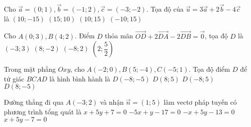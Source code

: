 \begin{ex}%
	Cho $\vec{a}=(0; 1), \vec{b}=(-1; 2), \vec{c}=(-3;-2)$. Tọa độ của $\vec{u}=3 \vec{a}+2 \vec{b}-4 \vec{c}$ là
	\choice
	{$(10;-15)$}
	{$(15; 10)$}
	{\True $(10; 15)$}
	{$(-10; 15)$}
\end{ex}
\begin{ex}%
	Cho $A(0; 3), B(4; 2)$. Điểm $D$ thỏa mãn $\overrightarrow{OD}+2 \overrightarrow{DA}-2 \overrightarrow{DB}=\overrightarrow{0}$, tọa độ $D$ là
	\choice
	{$(-3; 3)$}
	{\True $(8;-2)$}
	{$(-8; 2)$}
	{$\left(2; \dfrac{5}{2}\right)$}
\end{ex}
\begin{ex}%
	Trong mặt phẳng $Ox y$, cho $A(-2; 0), B(5;-4), C(-5; 1)$. Tọa độ điểm $D$ để tứ giác $BCAD$ là hình bình hành là
	\choice
	{$D(-8;-5)$}
	{$D(8; 5)$}
	{$D(-8; 5)$}
	{\True $D(8;-5)$}
\end{ex}
\begin{ex}%
	Đường thẳng đi qua $A(-3; 2)$ và nhận $\vec{n}=(1; 5)$ làm vectơ pháp tuyến có phương trình tổng quát là
	\choice
	{$x+5 y+7=0$}
	{$-5 x+y-17=0$}
	{$-x+5 y-13=0$}
	{\True $x+5 y-7=0$}
\end{ex}
